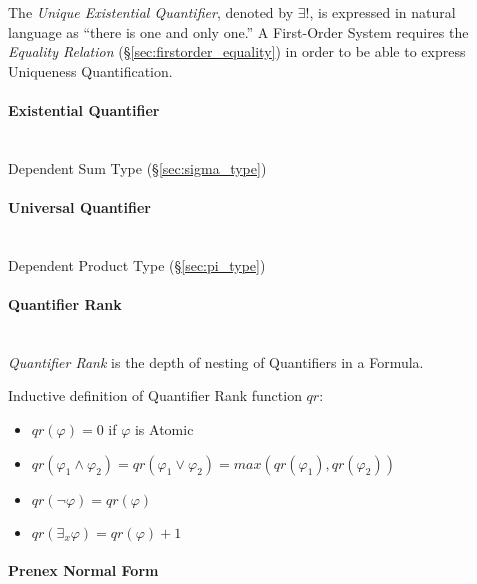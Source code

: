 The \emph{Unique Existential Quantifier}, denoted by $\exists !$, is
expressed in natural language as ``there is one and only one.'' A
First-Order System requires the \emph{Equality Relation}
(\S\ref{sec:firstorder_equality}) in order to be able to express
Uniqueness Quantification.



\paragraph{Existential Quantifier}\label{sec:existential_quantifier}
\hfill \\

Dependent Sum Type (\S\ref{sec:sigma_type})



\paragraph{Universal Quantifier}\label{sec:universal_quantifier}
\hfill \\

Dependent Product Type (\S\ref{sec:pi_type})



\paragraph{Quantifier Rank}\label{sec:quantifier_rank}\hfill \\

\emph{Quantifier Rank} is the depth of nesting of Quantifiers in a
Formula.

Inductive definition of Quantifier Rank function $qr$:
\begin{itemize}
  \item $qr(\varphi) = 0$ if $\varphi$ is Atomic
  \item $qr(\varphi_1 \wedge \varphi_2) =
    qr(\varphi_1 \vee \varphi_2) = max(qr(\varphi_1),qr(\varphi_2))$
  \item $qr(\neg \varphi) = qr(\varphi)$
  \item $qr(\exists_x \varphi) = qr(\varphi) + 1$
\end{itemize}



\paragraph{Prenex Normal Form}\label{sec:prenex_normal}\hfill \\

